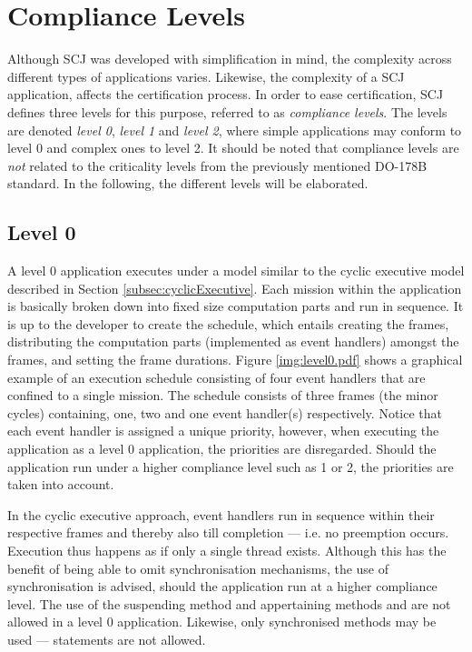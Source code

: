 \section{Compliance Levels}
\label{section:complianceLevels}
Although SCJ was developed with simplification in mind, the complexity across different types of applications varies. Likewise, the complexity of a SCJ application, affects the certification process. In order to ease certification, SCJ defines three levels for this purpose, referred to as \textit{compliance levels}. The levels are denoted \textit{level 0}, \textit{level 1} and \textit{level 2}, where simple applications may conform to level 0 and complex ones to level 2. It should be noted that compliance levels are \textit{not} related to the criticality levels from the previously mentioned DO-178B standard. In the following, the different levels will be elaborated.

\subsection{Level 0}
A level 0 application executes under a model similar to the cyclic executive model described in Section \ref{subsec:cyclicExecutive}. Each mission within the application is basically broken down into fixed size computation parts and run in sequence. It is up to the developer to create the schedule, which entails creating the frames, distributing the computation parts (implemented as event handlers) amongst the frames, and setting the frame durations. Figure \ref{img:level0.pdf} shows a graphical example of an execution schedule consisting of four event handlers that are confined to a single mission. The schedule consists of three frames (the minor cycles) containing, one, two and one event handler(s) respectively. Notice that each event handler is assigned a unique priority, however, when executing the application as a level 0 application, the priorities are disregarded. Should the application run under a higher compliance level such as 1 or 2, the priorities are taken into account.


In the cyclic executive approach, event handlers run in sequence within their respective frames and thereby also till completion --- i.e. no preemption occurs. Execution thus happens as if only a single thread exists. Although this has the benefit of being able to omit synchronisation mechanisms, the use of synchronisation is advised, should the application run at a higher compliance level. The use of the suspending method  and appertaining methods  and  are not allowed in a level 0 application. Likewise, only synchronised methods may be used ---  statements are not allowed.

